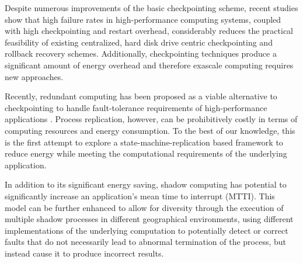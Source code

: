 Despite numerous improvements of the basic checkpointing scheme,
recent studies show that high failure rates in high-performance
computing systems, coupled with high checkpointing and restart
overhead, considerably reduces the practical feasibility of existing
centralized, hard disk drive centric checkpointing and rollback
recovery schemes. Additionally, checkpointing techniques produce a
significant amount of energy overhead \cite{diouri_dsn_2012} and
therefore exascale computing requires new approaches.

Recently, redundant computing has been proposed as a viable
alternative to checkpointing to handle fault-tolerance requirements of
high-performance applications \cite{ferreira_hpc_2011,
riesen_sandia_2010}. Process replication, however, can be
prohibitively costly in terms of computing resources and energy
consumption. To the best of our knowledge, this is the first attempt
to explore a state-machine-replication based framework to reduce
energy while meeting the computational requirements of the underlying
application.

In addition to its significant energy saving, shadow computing has
potential to significantly increase an application's mean time to
interrupt (MTTI). This model can be further enhanced to allow for
diversity through the execution of multiple shadow processes in
different geographical environments, using different implementations
of the underlying computation to potentially detect or correct faults
that do not necessarily lead to abnormal termination of the process,
but instead cause it to produce incorrect results.

